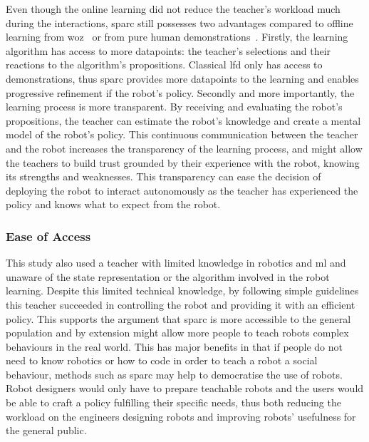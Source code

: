 Even though the online learning did not reduce the teacher's workload much during the interactions, \gls{sparc} still possesses two advantages compared to offline learning from \gls{woz}~\citep{sequeira2016discovering} or from pure human demonstrations~\citep{liu2014train}. Firstly, the learning algorithm has access to more datapoints: the teacher's selections and their reactions to the algorithm's propositions. Classical \gls{lfd} only has access to demonstrations, thus \gls{sparc} provides more datapoints to the learning and enables progressive refinement if the robot's policy. Secondly and more importantly, the learning process is more transparent. By receiving and evaluating the robot's propositions, the teacher can estimate the robot's knowledge and create a mental model of the robot's policy. This continuous communication between the teacher and the robot increases the transparency of the learning process, and might allow the teachers to build trust grounded by their experience with the robot, knowing its strengths and weaknesses. This transparency can ease the decision of deploying the robot to interact autonomously as the teacher has experienced the policy and knows what to expect from the robot.

\subsubsection{Ease of Access}

This study also used a teacher with limited knowledge in robotics and \gls{ml} and unaware of the state representation or the algorithm involved in the robot learning. Despite this limited technical knowledge, by following simple guidelines this teacher succeeded in controlling the robot and providing it with an efficient policy.
This supports the argument that \gls{sparc} is more accessible to the general population and by extension might allow more people to teach robots complex behaviours in the real world. This has major benefits in that if people do not need to know robotics or how to code in order to teach a robot a social behaviour, methods such as \gls{sparc} may help to democratise the use of robots. Robot designers would only have to prepare teachable robots and the users would be able to craft a policy fulfilling their specific needs, thus both reducing the workload on the engineers designing robots and improving robots' usefulness for the general public.


